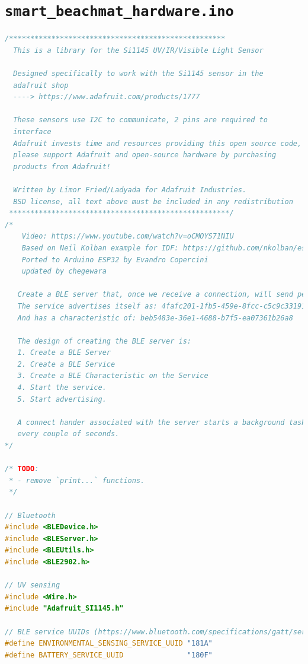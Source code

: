 \documentclass[12pt,openany,a4paper]{book}
\begin{document}
\section{\texttt{smart\_beachmat\_hardware.ino}}
\label{code:final}
\begin{lstlisting}[basicstyle=\ttfamily,breaklines=true,language=c++]
/*************************************************** 
  This is a library for the Si1145 UV/IR/Visible Light Sensor

  Designed specifically to work with the Si1145 sensor in the
  adafruit shop
  ----> https://www.adafruit.com/products/1777

  These sensors use I2C to communicate, 2 pins are required to  
  interface
  Adafruit invests time and resources providing this open source code, 
  please support Adafruit and open-source hardware by purchasing 
  products from Adafruit!

  Written by Limor Fried/Ladyada for Adafruit Industries.  
  BSD license, all text above must be included in any redistribution
 ****************************************************/
/*
    Video: https://www.youtube.com/watch?v=oCMOYS71NIU
    Based on Neil Kolban example for IDF: https://github.com/nkolban/esp32-snippets/blob/master/cpp_utils/tests/BLE%20Tests/SampleNotify.cpp
    Ported to Arduino ESP32 by Evandro Copercini
    updated by chegewara

   Create a BLE server that, once we receive a connection, will send periodic notifications.
   The service advertises itself as: 4fafc201-1fb5-459e-8fcc-c5c9c331914b
   And has a characteristic of: beb5483e-36e1-4688-b7f5-ea07361b26a8

   The design of creating the BLE server is:
   1. Create a BLE Server
   2. Create a BLE Service
   3. Create a BLE Characteristic on the Service
   4. Start the service.
   5. Start advertising.

   A connect hander associated with the server starts a background task that performs notification
   every couple of seconds.
*/

/* TODO:
 * - remove `print...` functions.
 */

// Bluetooth
#include <BLEDevice.h>
#include <BLEServer.h>
#include <BLEUtils.h>
#include <BLE2902.h>

// UV sensing
#include <Wire.h>
#include "Adafruit_SI1145.h"

// BLE service UUIDs (https://www.bluetooth.com/specifications/gatt/services)
#define ENVIRONMENTAL_SENSING_SERVICE_UUID "181A"
#define BATTERY_SERVICE_UUID               "180F"


\end{lstlisting}
\end{document}
